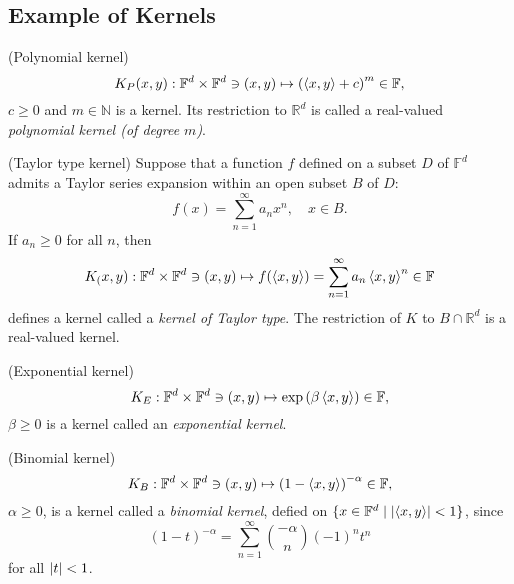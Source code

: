 \documentclass[a4paper,12pt]{article}
\begin{document}
\subsection{Example of Kernels}

\begin{ex}(Polynomial kernel)\label{ex polynomial kernel}
	\[
		K_P(x,y) : \mathbb{F}^d \times \mathbb{F}^d \ni (x,y) \mapsto  \left( \left<x, y \right> + c \right)^{m} \in \mathbb{F},
	\]
	\( c \ge 0 \) and \( m \in \mathbb{N} \) is a kernel. Its restriction to \( \mathbb{R}^d \) is called a real-valued \textit{polynomial kernel (of degree \( m \))}.
	\fin\end{ex}

\begin{ex} (Taylor type kernel) \label{ex taylor kernel}
	Suppose that a function \( f \) defined on a subset \( D \) of \( \mathbb{F}^d \) admits a Taylor series expansion within an open subset \( B \) of \( D \):
	\[
		f(x) = \sum_{n=1}^{\infty} a_n x^{n},\quad x \in B.
	\]
	If \( a_n \ge 0 \) for all \( n \), then
	\[
		K_(x,y) : \mathbb{F}^d \times \mathbb{F}^d \ni (x,y)
		\mapsto f(\left<x, y \right>) = \sum_{n=1}^{\infty} a_n \left<x, y \right>^n
		\in \mathbb{F}
	\]
	defines a kernel called a \textit{kernel of Taylor type}. The restriction of \( K \) to \( B \cap \mathbb{R}^d \) is a real-valued kernel.
	\fin\end{ex}

\begin{ex}(Exponential kernel) \label{ex exponential kernel}
	\[
		K_E : \mathbb{F}^d \times \mathbb{F}^d \ni (x,y)
		\mapsto \exp \left( \beta \left<x, y \right> \right) \in \mathbb{F},
	\]
	\( \beta \ge 0 \) is a kernel called an \textit{exponential kernel}.
	\fin\end{ex}

\begin{ex}(Binomial kernel) \label{ex binomial kernel}
	\[
		K_B : \mathbb{F}^d \times \mathbb{F}^d \ni (x,y)
		\mapsto \left( 1 - \left<x, y \right> \right)^{-\alpha} \in \mathbb{F},
	\]
	\( \alpha \ge 0 \), is a kernel called a \textit{binomial kernel}, defied on \( \{ x \in \mathbb{F}^d \mid \left| \left<x, y \right> \right|< 1\} \),
	since
	\[
		(1-t)^{-\alpha} = \sum_{n=1}^{\infty} \binom{-\alpha}{n}(-1)^{n}t^{n}
	\]
	for all \( \left| t \right| < 1 \).
	\fin\end{ex}
\end{document}
